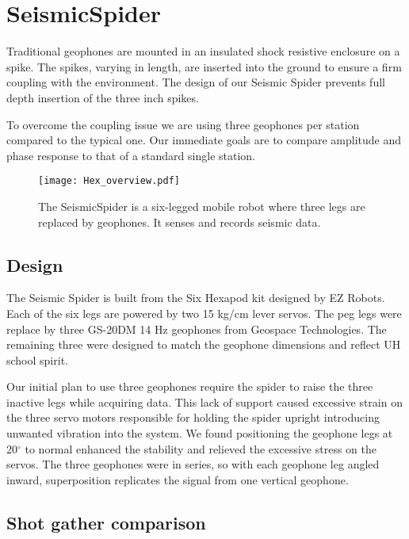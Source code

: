 \section{SeismicSpider}\label{sec:SeismicSpider}

Traditional geophones are mounted in an insulated shock resistive enclosure on a spike. The spikes, varying in length, are inserted into the ground to ensure a firm coupling with the environment. The design of our Seismic Spider prevents full depth insertion of the three inch spikes. 

	To overcome the coupling issue we are using three geophones per station compared to the typical one. Our immediate goals are to compare amplitude and phase response to that of a standard single station.	

\begin{figure} \centering
  {\texttt{[image: Hex\_overview.pdf]}}
 \caption{The SeismicSpider is a six-legged mobile robot where three legs are replaced by geophones. It senses and records seismic data.} 
 \label{fig:TradvsAutoDrop}
\end{figure}
\subsection{Design}

The Seismic Spider is built from the Six Hexapod kit designed by EZ Robots. Each of the six legs are powered by two 15 kg/cm lever servos. The peg legs were replace by three GS-20DM 14 Hz geophones from Geospace Technologies. The remaining three were designed to match the geophone dimensions and reflect UH school spirit.

 Our initial plan to use three geophones require the spider to raise the three inactive legs while acquiring data. This lack of support caused excessive strain on the three servo motors responsible for holding the spider upright introducing unwanted vibration into the system. We found positioning the geophone legs at 20$^\circ$ to normal enhanced the stability and relieved the excessive stress on the servos. 
 The three geophones were in series, so with each geophone leg angled inward, superposition replicates the signal from one vertical geophone.

\subsection{Shot gather comparison}

